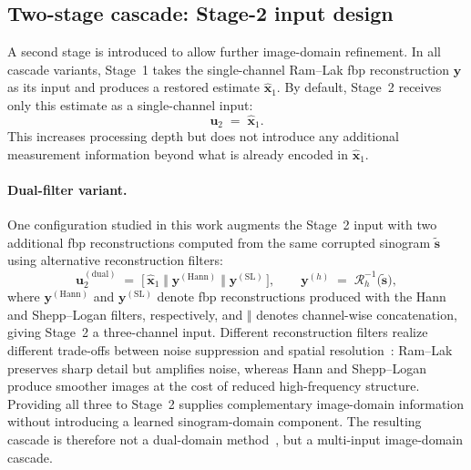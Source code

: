\subsection{Two-stage cascade: Stage-2 input design}
\label{subsec:meth_cascade_input}

A second stage is introduced to allow further image-domain refinement. In all cascade variants, Stage~1 takes the single-channel Ram--Lak \gls{fbp} reconstruction $\mathbf{y}$ as its input and produces a restored estimate $\hat{\mathbf{x}}_1$. By default, Stage~2 receives only this estimate as a single-channel input:
\begin{equation}
    \mathbf{u}_2 \;=\; \hat{\mathbf{x}}_1.
    \label{eq:meth_default_input}
\end{equation}
This increases processing depth but does not introduce any additional measurement information beyond what is already encoded in $\hat{\mathbf{x}}_1$.

\paragraph{Dual-filter variant.}
One configuration studied in this work augments the Stage~2 input with two additional \gls{fbp} reconstructions computed from the same corrupted sinogram $\tilde{\mathbf{s}}$ using alternative reconstruction filters:
\begin{equation}
    \mathbf{u}_2^{(\mathrm{dual})}
    \;=\; \bigl[\,\hat{\mathbf{x}}_1\;\Vert\;\mathbf{y}^{(\mathrm{Hann})}\;\Vert\;\mathbf{y}^{(\mathrm{SL})}\,\bigr],
    \qquad
    \mathbf{y}^{(h)} \;=\; \mathcal{R}^{-1}_{h}\!\bigl(\tilde{\mathbf{s}}\bigr),
    \label{eq:meth_alt_input}
\end{equation}
where $\mathbf{y}^{(\mathrm{Hann})}$ and $\mathbf{y}^{(\mathrm{SL})}$ denote \gls{fbp} reconstructions produced with the Hann and Shepp--Logan filters, respectively, and $\Vert$ denotes channel-wise concatenation, giving Stage~2 a three-channel input. Different reconstruction filters realize different trade-offs between noise suppression and spatial resolution~\cite{KakSlaney1988}: Ram--Lak preserves sharp detail but amplifies noise, whereas Hann and Shepp--Logan produce smoother images at the cost of reduced high-frequency structure. Providing all three to Stage~2 supplies complementary image-domain information without introducing a learned sinogram-domain component. The resulting cascade is therefore not a dual-domain method~\cite{Wang2020, Zhang2022}, but a multi-input image-domain cascade.

